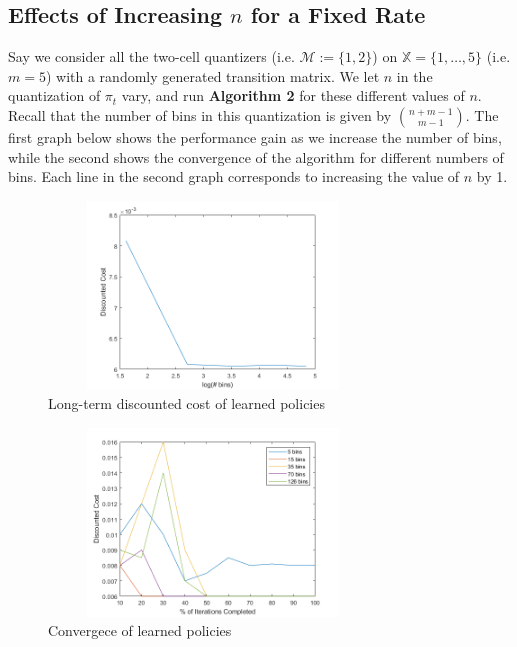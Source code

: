 \documentclass[conference]{IEEEtran}
\begin{document}
\subsection{Effects of Increasing \(n\) for a Fixed Rate}
Say we consider all the two-cell quantizers (i.e. \(\mathcal{M} := \{1,2\}\)) on \( \mathbb{X} = \{1,\ldots,5\} \) (i.e. \(m = 5\)) with a randomly generated transition matrix. We let \(n\) in the quantization of \( \pi_t \) vary, and run \textbf{Algorithm 2} for these different values of \(n\). Recall that the number of bins in this quantization is given by \({{n+m-1} \choose {m-1}}\). The first graph below shows the performance gain as we increase the number of bins, while the second shows the convergence of the algorithm for different numbers of bins. Each line in the second graph corresponds to increasing the value of \(n\) by 1.
\vspace{-1em}
\begin{figure}[H]
    \centering
    \includegraphics[height=5cm, width=8.75cm]{cost_5.png}
    \caption{Long-term discounted cost of learned policies}
\end{figure}
\vspace{-1em}
\begin{figure}[H]
    \centering
    \includegraphics[height=5cm, width=8.75cm]{convergence_5.png}
    \caption{Convergece of learned policies}
\end{figure}
\end{document}

